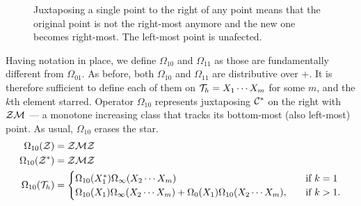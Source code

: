 \documentclass[12pt, a4paper, twoside]{report}
\begin{document}
\begin{figure}[ht]
 \centering
    \caption{Juxtaposing a single point to the right of any point means that the original point is not the right-most anymore and the new one becomes right-most. The left-most point is unafected.}
    \label{fig:omega_1}
\end{figure}

Having notation in place, we define $\Omega_{10}$ and $\Omega_{11}$ as those are fundamentally different from $\Omega_{01}$. As before, both $\Omega_{10}$ and $\Omega_{11}$ are distributive over $+$. It is therefore sufficient to define each of them on $\mathcal{T}_h = X_1\cdots X_m$ for some $m$, and the $k$th element starred. Operator $\Omega_{10}$ represents juxtaposing $\mathcal{C}^*$ on the right with $\mathcal{Z}\mathcal{M}$ --- a monotone increasing class that tracks its bottom-most (also left-most) point. As usual, $\Omega_{10}$ erases the star.
\begin{align*}
  \Omega_{10}(\mathcal{Z}) &= \mathcal{Z}\mathcal{M}\mathcal{Z}\\
  \Omega_{10}(\mathcal{Z}^*) &= \mathcal{Z}\mathcal{M}\mathcal{Z}\\
  \Omega_{10}(\mathcal{T}_h) &=
                      \begin{cases}
                        \Omega_{10}(X_1^*)\Omega_\infty(X_2\cdots X_m) \quad &\text{if $k = 1$}\\
                        \Omega_{10}(X_1)\Omega_\infty(X_2\cdots X_m) + \Omega_0(X_1)\Omega_{10}(X_2\cdots X_m),\quad &\text{if $k>1$.}
                      \end{cases}
\end{align*}
\end{document}
